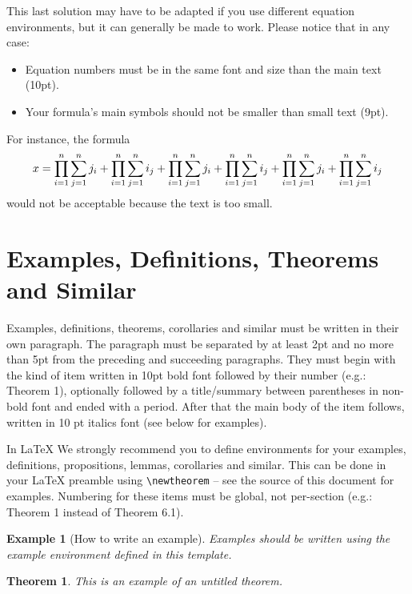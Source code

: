 \documentclass{article}
\newtheorem{example}{Example}
\newtheorem{theorem}{Theorem}
\begin{document}
This last solution may have to be adapted if you use different equation environments, but it can generally be made to work. Please notice that in any case:

\begin{itemize}
\item Equation numbers must be in the same font and size than the main text
  (10pt).
\item Your formula's main symbols should not be smaller than {\small small}
  text (9pt).
\end{itemize}

For instance, the formula
%
\begin{equation}
    \resizebox{.91\linewidth}{!}{$
    \displaystyle
    x = \prod_{i=1}^n \sum_{j=1}^n j_i + \prod_{i=1}^n \sum_{j=1}^n i_j + \prod_{i=1}^n \sum_{j=1}^n j_i + \prod_{i=1}^n \sum_{j=1}^n i_j + \prod_{i=1}^n \sum_{j=1}^n j_i + \prod_{i=1}^n \sum_{j=1}^n i_j
$}
\end{equation}
%
would not be acceptable because the text is too small.

\section{Examples, Definitions, Theorems and Similar}

Examples, definitions, theorems, corollaries and similar must be written in
their own paragraph. The paragraph must be separated by at least 2pt and no
more than 5pt from the preceding and succeeding paragraphs. They must begin
with the kind of item written in 10pt bold font followed by their number (e.g.:
Theorem 1), optionally followed by a title/summary between parentheses in
non-bold font and ended with a period. After that the main body of the item
follows, written in 10 pt italics font (see below for examples).

In \LaTeX{} We strongly recommend you to define environments for your examples,
definitions, propositions, lemmas, corollaries and similar. This can be done in
your \LaTeX{} preamble using \texttt{\textbackslash{}newtheorem} -- see the
source of this document for examples. Numbering for these items must be global,
not per-section (e.g.: Theorem 1 instead of Theorem 6.1).

\begin{example}[How to write an example]
Examples should be written using the example environment defined in this template.
\end{example}

\begin{theorem}
This is an example of an untitled theorem.
\end{theorem}
\end{document}
